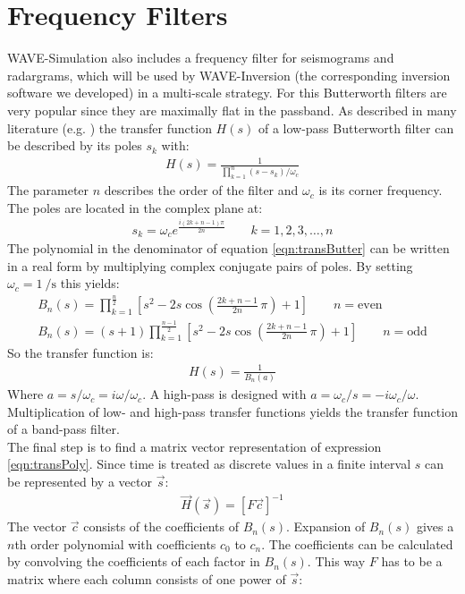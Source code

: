 \documentclass[pdftex,a4paper,parskip,listof=totoc,bibliography=totoc,onehalfspacing,12pt]{scrreprt}
\begin{document}
\chapter{Frequency Filters}
WAVE-Simulation also includes a frequency filter for seismograms and radargrams, which will be used by WAVE-Inversion (the corresponding inversion software we developed) in a multi-scale strategy. For this Butterworth filters are very popular since they are maximally flat in the passband. As described in many literature (e.g. \cite{bianchi2007electronic}) the transfer function $H(s)$ of a low-pass Butterworth filter can be described by its poles $s_k$ with:
\begin{align}
 H(s)=\frac{1}{\prod_{k=1}^n (s-s_k)/\omega_c} \label{eqn:transButter}
\end{align}
The parameter $n$ describes the order of the filter and $\omega_c$ is its corner frequency. 
The poles are located in the complex plane at:
\begin{align}
 s_k = \omega_c e^{\frac{i(2k+n-1)\pi}{2n}}\qquad k = 1,2,3,\ldots, n
\end{align}
The polynomial in the denominator of equation \ref{eqn:transButter} can be written in a real form by multiplying complex conjugate pairs of poles. By setting $\omega_c = \SI{1}{\per\second}$ this yields:
\begin{align}
  B_n(s)=\prod_{k=1}^{\frac{n}{2}} \left[s^2-2s\cos\left(\frac{2k+n-1}{2n}\,\pi\right)+1\right]\qquad n = \text{even} \\
  B_n(s)=(s+1)\prod_{k=1}^{\frac{n-1}{2}} \left[s^2-2s\cos\left(\frac{2k+n-1}{2n}\,\pi\right)+1\right]\qquad n = \text{odd}
\end{align}
So the transfer function is:
\begin{align}
H(s) = \frac{1}{B_n(a)} \label{eqn:transPoly}
\end{align}
Where $a= s/\omega_c = i \omega / \omega_c$. A high-pass is designed with $a= \omega_c/s = -i \omega_c / \omega$. Multiplication of low- and high-pass transfer functions yields the transfer function of a band-pass filter.\\ The final step is to find a matrix vector representation of expression \ref{eqn:transPoly}. Since time is treated as discrete values in a finite interval $s$ can be represented by a vector $\vec{s}$:
\begin{align}
 \vec{H}(\vec{s}) = \left[ F \vec{c} \right]^{-1}
\end{align}
The vector $\vec{c}$ consists of the coefficients of $B_n(s)$. Expansion of $B_n(s)$ gives a $n$th order polynomial with coefficients $c_0$ to $c_n$. The coefficients can be calculated by convolving the coefficients of each factor in $B_n(s)$. This way $F$ has to be a matrix where each column consists of one power of $\vec{s}$:
\end{document}
